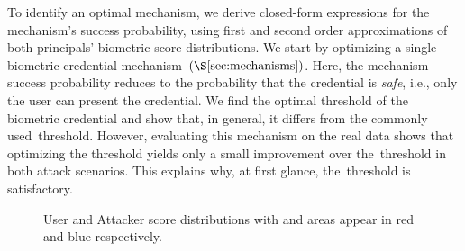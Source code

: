 \documentclass[conference,compsoc]{IEEEtran}
\begin{document}
To identify an optimal mechanism, we derive closed-form expressions for the mechanism's success probability, using first and second order approximations of both principals' biometric score distributions. We start by optimizing a single biometric credential mechanism~$(\S\ref{sec:mechanisms})$. Here, the mechanism success probability reduces to the probability that the credential is \emph{safe}, i.e., only the user can present the credential. We find the optimal threshold of the biometric credential and show that, in general, it differs from the commonly used~\EER threshold. However, evaluating this mechanism on the real data shows that optimizing the threshold yields only a small improvement over the~\EER threshold in both attack scenarios. This explains why, at first glance, the~\EER threshold is satisfactory.

\begin{figure}[t]
\centering
{}
\caption{User and Attacker score distributions with \FAR and \FRR areas appear in red and blue respectively.}
\label{fig:intro-fig}
\end{figure}
\end{document}
